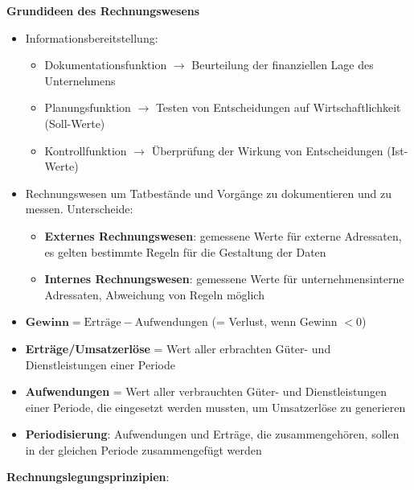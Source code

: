 \pagebreak
\textbf{Grundideen des Rechnungswesens}
\begin{itemize}
	\item Informationsbereitstellung:
	\begin{itemize}
		\item Dokumentationsfunktion $\rightarrow$ Beurteilung der finanziellen Lage des Unternehmens
		\item Planungsfunktion $\rightarrow$ Testen von Entscheidungen auf Wirtschaftlichkeit (Soll-Werte)
		\item Kontrollfunktion $\rightarrow$ Überprüfung der Wirkung von Entscheidungen (Ist-Werte)
	\end{itemize}
	\item Rechnungswesen um Tatbestände und Vorgänge zu dokumentieren und zu messen. Unterscheide:
	\begin{itemize}
		\item \textbf{Externes Rechnungswesen}: gemessene Werte für externe Adressaten, es gelten bestimmte Regeln für die Gestaltung der Daten
		\item  \textbf{Internes Rechnungswesen}: gemessene Werte für unternehmensinterne Adressaten, Abweichung von Regeln möglich
	\end{itemize}
	\item $\textbf{Gewinn}=\text{Erträge}-\text{Aufwendungen}$ (= Verlust, wenn Gewinn $<0$)
	\item \textbf{Erträge/Umsatzerlöse} = Wert aller erbrachten Güter- und Dienstleistungen einer Periode
	\item \textbf{Aufwendungen} = Wert aller verbrauchten Güter- und Dienstleistungen einer
	Periode, die eingesetzt werden mussten, um Umsatzerlöse zu generieren
	\item \textbf{Periodisierung}: Aufwendungen und Erträge, die zusammengehören, sollen in der gleichen Periode zusammengefügt werden
\end{itemize}
\bigskip
\textbf{Rechnungslegungsprinzipien}:
